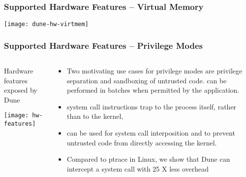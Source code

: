 \begin{frame}[plain]
	\frametitle{ Supported Hardware Features -- Virtual Memory}
	
	\centering
	
	
	\texttt{[image: dune-hw-virtmem]}

	
\end{frame}
\begin{frame}[plain]
	\frametitle{Supported Hardware Features -- Privilege Modes}
	
	
	
	\begin{columns}
		
		\begin{column}{.4\textwidth}
			\centering
			Hardware features exposed by Dune
			
			\texttt{[image: hw-features]}
			
		\end{column}
		
		\begin{column}{.6\textwidth}
			
			
			\begin{itemize}
				\item  Two motivating use cases for
				privilege modes are privilege separation and sandboxing
				of untrusted code.
				can be performed in batches when permitted by the application. 
				\item system
				call instructions trap to the process itself, rather than to
				the kernel,
				\item can be used for system call interposition and to prevent untrusted code from directly accessing	the kernel.
				\item Compared to ptrace in Linux, we show that
				Dune can intercept a system call with 25 X less overhead
				
			\end{itemize}					
			
		\end{column}
		
		
	\end{columns}
	
	
\end{frame}



